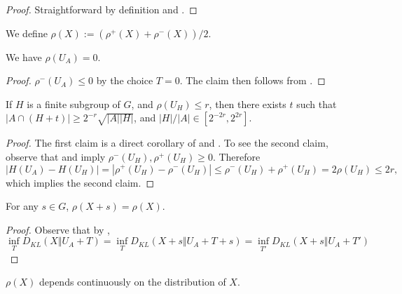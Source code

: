 \begin{proof} Straightforward by definition and .
\end{proof}

\begin{definition}\label{rho-def}\leanok  We define $\rho(X) := (\rho^+(X) + \rho^-(X))/2$.
\end{definition}

\begin{lemma}\label{rho-init}\label{rho_of_uniform}\leanok  We have $\rho(U_A) = 0$.
\end{lemma}

\begin{proof} $\rho^-(U_A)\le 0$ by the choice $T=0$. The claim then follows from .
\end{proof}

\begin{lemma}\label{rho-subgroup}  If $H$ is a finite subgroup of $G$, and $\rho(U_H) \leq r$, then there exists $t$ such that $|A \cap (H+t)| \geq 2^{-r} \sqrt{|A||H|}$, and $|H|/|A|\in[2^{-2r},2^{2r}]$.
\end{lemma}

\begin{proof} The first claim is a direct corollary of  and . To see the second claim, observe that  and  imply $\rho^-(U_H),\rho^+(U_H)\ge 0$. Therefore $$|H(U_A)-H(U_H)|=|\rho^+(U_H)-\rho^-(U_H)|\le \rho^-(U_H)+\rho^+(U_H)= 2\rho(U_H)\le 2r,$$
  which implies the second claim.
\end{proof}

\begin{lemma}\label{rho-invariant}  For any $s \in G$, $\rho(X+s) = \rho(X)$.
\end{lemma}

\begin{proof} Observe that by , $$\inf_T D_{KL}(X\Vert U_A+T)=\inf_T D_{KL}(X+s\Vert U_A+T+s)=\inf_{T'} D_{KL}(X+s\Vert U_A+T')$$
\end{proof}

\begin{lemma}\label{rho-cts} $\rho(X)$ depends continuously on the distribution of $X$.
\end{lemma}

